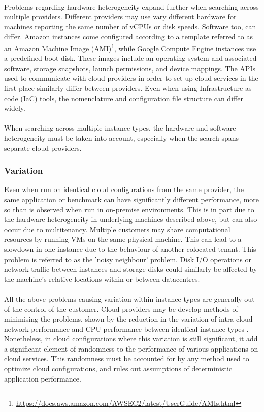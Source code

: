 \documentclass{report}
\begin{document}
\paragraph{}
Problems regarding hardware heterogeneity expand further when searching across multiple providers. Different providers may use vary different hardware for machines reporting the same number of vCPUs or disk speeds. Software too, can differ. Amazon instances come configured according to a template referred to as an Amazon Machine Image (AMI)\footnote{\url{https://docs.aws.amazon.com/AWSEC2/latest/UserGuide/AMIs.html}}, while Google Compute Engine instances use a predefined boot disk. These images include an operating system and associated software, storage snapshots, launch permissions, and device mappings. The APIs used to communicate with cloud providers in order to set up cloud services in the first place similarly differ between providers. Even when using Infrastructure as code (IaC) tools, the nomenclature and configuration file structure can differ widely.
\paragraph{}
When searching across multiple instance types, the hardware and software heterogeneity must be taken into account, especially when the search spans separate cloud providers. 
\subsubsection{Variation}
Even when run on identical cloud configurations from the same provider, the same application or benchmark can have significantly different performance, more so than is observed when run in on-premise environments\cite{Leitner2014}. This is in part due to the hardware heterogeneity in underlying machines described above, but can also occur due to multitenancy. Multiple customers may share computational resources by running VMs on the same physical machine. This can lead to a slowdown in one instance due to the behaviour of another colocated tenant. This problem is referred to as the 'noisy neighbour' problem\cite{Gkatzikis2013}. Disk I/O operations or network traffic between instances and storage disks could similarly be affected by the machine's relative locations within or between datacentres. 
\paragraph{}
All the above problems causing variation within instance types are generally out of the control of the customer. Cloud providers may be develop methods of minimising the problems, shown by the reduction in the variation of intra-cloud network performance\cite{Scheuner2018a} and CPU performance between identical instance types \cite{Davatz2017, Laaber2019}.  Nonetheless, in cloud configurations where this variation is still significant, it add a significant element of randomness to the performance of various applications on cloud services. This randomness must be accounted for by any method used to optimize cloud configurations, and rules out assumptions of deterministic application performance. 
\end{document}
